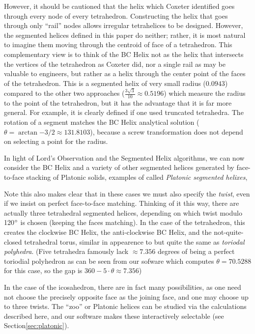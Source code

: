 \documentclass[11pt]{article}
\begin{document}
{However, it should be cautioned that the helix which Coxeter identified\cite{coxeter1985simplicial} goes through every node of every tetrahedron. Constructing the helix that goes
through only ``rail'' nodes allows irregular tetrahelices to be designed\cite{read2018transforming}.
However, the segmented helices defined in this paper do neither; rather, it is most natural to
imagine them moving through the centroid of face of a tetrahedron.
This complementary view is to think of the BC Helix not as the helix that
intersects the vertices of the tetrahedron as Coxeter did\cite{coxeter1985simplicial}, nor a single
rail as may be valuable to engineers\cite{read2018transforming}, but rather as a helix through
the center point of the faces of the tetrahedron. This is a segmented helix of
very small radius ($0.0943$) compared to the other two approaches
($\frac{3\sqrt{3}}{10} \approx 0.5196$) which measure the radius to the
point of the tetrahedron, but it has
the advantage that it is far more general. For example, it is
clearly defined if one used truncated tetrahedra.
The rotation of a
segment matches the BC Helix analytical solution
($\theta = \arctan{-3/2} \approx 131.8103$),
because a screw transformation does not depend on selecting a point for the radius.

In light of Lord's Observation and the Segmented Helix algorithms, we can now
consider the BC Helix and a variety of other segmented helices generated by
face-to-face stacking of Platonic solids, examples of called {\em Platonic segmented helixes},

Note this also makes clear that in these cases we must also specify the {\em twist},
even if we insist on perfect face-to-face matching. Thinking of it this
way, there are actually three tetrahedral segmented helices,
depending on which twist modulo 120$\degree$
is chosen (keeping the faces matching). In the case of the tetrahedron,
this creates the clockwise BC Helix, the anti-clockwise BC Helix, and the
not-quite-closed tetrahedral torus, similar in appearence to but quite the same as
{\em toriodal polyhedra}\cite{wiki:toroidalpolyhedra}.
(Five tetrahedra famously lack $\approx 7.356$ degrees of being a perfect toriodial polyhedron
as can be seen from our sofware which computes $\theta = 70.5288$ for this case,
so the gap is $360 - 5 \cdot \theta \approx 7.356$)

In the case of the icosahedron, there are in fact many possibilities,
as one need not choose the precisely opposite face as the joining face, and
one may choose up to three twists. The ``zoo'' or Platonic helices
can be studied via the calculations described here, and our software
makes these interactively selectable (see Section\ref{sec:platonic}).

}
\end{document}
